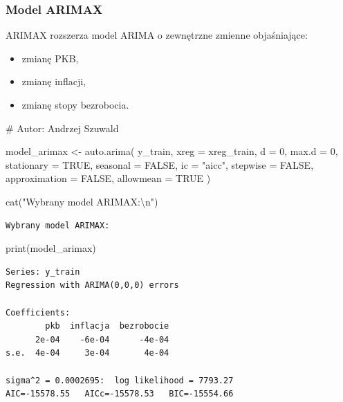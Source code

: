\documentclass[
  polish,
  letterpaper,
  DIV=11,
  numbers=noendperiod]{scrartcl}
\newenvironment{Shaded}{\begin{snugshade}}{\end{snugshade}}
\newcommand{\AttributeTok}[1]{\textcolor[rgb]{0.40,0.45,0.13}{#1}}
\newcommand{\CommentTok}[1]{\textcolor[rgb]{0.37,0.37,0.37}{#1}}
\newcommand{\ConstantTok}[1]{\textcolor[rgb]{0.56,0.35,0.01}{#1}}
\newcommand{\DecValTok}[1]{\textcolor[rgb]{0.68,0.00,0.00}{#1}}
\newcommand{\FunctionTok}[1]{\textcolor[rgb]{0.28,0.35,0.67}{#1}}
\newcommand{\NormalTok}[1]{\textcolor[rgb]{0.00,0.23,0.31}{#1}}
\newcommand{\OtherTok}[1]{\textcolor[rgb]{0.00,0.23,0.31}{#1}}
\newcommand{\SpecialCharTok}[1]{\textcolor[rgb]{0.37,0.37,0.37}{#1}}
\newcommand{\StringTok}[1]{\textcolor[rgb]{0.13,0.47,0.30}{#1}}
\providecommand{\tightlist}{%
  \setlength{\itemsep}{0pt}\setlength{\parskip}{0pt}}
\begin{document}
\subsubsection{Model ARIMAX}\label{model-arimax}

ARIMAX rozszerza model ARIMA o zewnętrzne zmienne objaśniające:

\begin{itemize}
\tightlist
\item
  zmianę PKB,
\item
  zmianę inflacji,
\item
  zmianę stopy bezrobocia.
\end{itemize}

\begin{Shaded}
\begin{Highlighting}[]
\CommentTok{\# Autor: Andrzej Szuwald}

\NormalTok{model\_arimax }\OtherTok{\textless{}{-}} \FunctionTok{auto.arima}\NormalTok{(}
\NormalTok{  y\_train,}
  \AttributeTok{xreg =}\NormalTok{ xreg\_train,}
  \AttributeTok{d =} \DecValTok{0}\NormalTok{,}
  \AttributeTok{max.d =} \DecValTok{0}\NormalTok{,}
  \AttributeTok{stationary =} \ConstantTok{TRUE}\NormalTok{,}
  \AttributeTok{seasonal =} \ConstantTok{FALSE}\NormalTok{,}
  \AttributeTok{ic =} \StringTok{"aicc"}\NormalTok{,}
  \AttributeTok{stepwise =} \ConstantTok{FALSE}\NormalTok{,}
  \AttributeTok{approximation =} \ConstantTok{FALSE}\NormalTok{,}
  \AttributeTok{allowmean =} \ConstantTok{TRUE}
\NormalTok{)}

\FunctionTok{cat}\NormalTok{(}\StringTok{"Wybrany model ARIMAX:}\SpecialCharTok{\textbackslash{}n}\StringTok{"}\NormalTok{)}
\end{Highlighting}
\end{Shaded}

\begin{verbatim}
Wybrany model ARIMAX:
\end{verbatim}

\begin{Shaded}
\begin{Highlighting}[]
\FunctionTok{print}\NormalTok{(model\_arimax)}
\end{Highlighting}
\end{Shaded}

\begin{verbatim}
Series: y_train 
Regression with ARIMA(0,0,0) errors 

Coefficients:
        pkb  inflacja  bezrobocie
      2e-04    -6e-04      -4e-04
s.e.  4e-04     3e-04       4e-04

sigma^2 = 0.0002695:  log likelihood = 7793.27
AIC=-15578.55   AICc=-15578.53   BIC=-15554.66
\end{verbatim}
\end{document}
